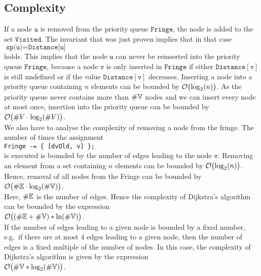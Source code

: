 \subsection{Complexity}
If a node $\texttt{u}$ is removed from the priority queue $\texttt{Fringe}$, the node is added to the set
$\texttt{Visited}$.  The invariant that was just proven implies that in that case
\\[0.2cm]
\hspace*{1.3cm}
$\texttt{sp(u)} = \texttt{Distance[u]}$
\\[0.2cm]
holds.  This implies that the node $\texttt{u}$ can never be reinserted into the priority queue
$\texttt{Fringe}$, because a node $\texttt{v}$ is only inserted in $\texttt{Fringe}$ if either 
 $\texttt{Distance}[\texttt{v}]$ is still undefined or if  the  value $\texttt{Distance}[\texttt{v}]$ decreases.  
Inserting a node into a priority queue containing  $n$ elements can be bounded by
$\mathcal{O}\bigl(\log_2(n)\bigr)$.  As the priority queue never contains more than $\#{\mathbb V}$ nodes and we
can insert every node at most once, insertion into the priority queue can be bounded by
\\[0.2cm]
\hspace*{1.3cm}
$\mathcal{O}\bigl(\#V \cdot \log_2(\#V)\bigr)$.
\\[0.2cm]
We also have to analyse the complexity of removing a node from the fringe. 
The number of times the assignment
\\[0.2cm]
\hspace*{1.3cm}
\texttt{Fringe -= \{ [dvOld, v] \};} 
\\[0.2cm]
is executed is bounded by the number of edges leading to the node $\texttt{v}$.
Removing an element from a set containing $n$ elements can be bounded by
 $\mathcal{O}\bigl(\log_2(n)\bigr)$.  Hence, removal of all nodes from the Fringe can be bounded by
\\[0.2cm]
\hspace*{1.3cm}
$\mathcal{O}\bigl(\#{\mathbb E} \cdot \log_2(\#{\mathbb V})\bigr)$.
\\[0.2cm]
Here,  $\#{\mathbb E}$ is the number of edges.  Hence the complexity of Dijkstra's algorithm can be
bounded by the expression \\[0.2cm]
\hspace*{1.3cm} $\mathcal{O}\bigl((\#{\mathbb E} + \#{\mathbb V}) * \ln(\#{\mathbb V})\bigr)$. \\[0.2cm]
If the number of edges leading  to a given node is bounded by a fixed number, e.g.~if there
are at most 4 edges leading to a given node, then the number of edges is a fixed multiple of the
number of nodes.  In this case, the complexity of 
 Dijkstra's algorithm is given by the expression  
\\[0.2cm]
\hspace*{1.3cm}
$\mathcal{O}\bigl(\#{\mathbb V} * \log_2(\#{\mathbb V})\bigr)$.

